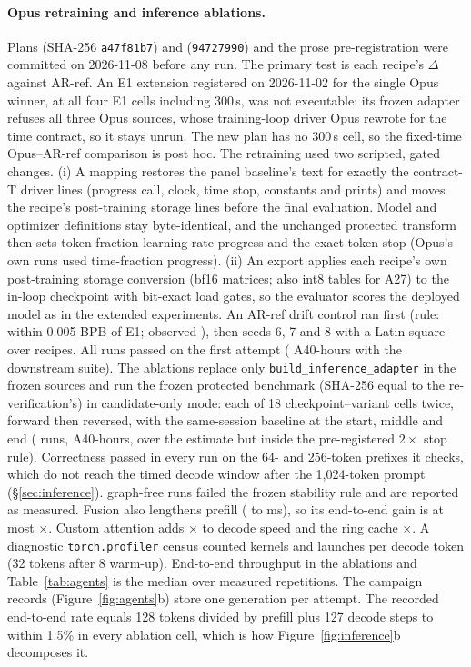 \documentclass{article}
\begin{document}
\paragraph{Opus retraining and inference ablations.} Plans  (SHA-256 \texttt{a47f81b7}) and  (\texttt{94727990}) and the prose pre-registration  were committed on 2026-11-08 before any run. The primary test is each recipe's $\Delta$ against AR-ref. An E1 extension registered on 2026-11-02 for the single Opus winner, at all four E1 cells including 300\,s, was not executable: its frozen adapter refuses all three Opus sources, whose training-loop driver Opus rewrote for the time contract, so it stays unrun. The new plan has no 300\,s cell, so the fixed-time Opus--AR-ref comparison is post hoc. The retraining used two scripted, gated changes. (i) A mapping restores the panel baseline's text for exactly the contract-T driver lines (progress call, clock, time stop, constants and prints) and moves the recipe's post-training storage lines before the final evaluation. Model and optimizer definitions stay byte-identical, and the unchanged protected transform then sets token-fraction learning-rate progress and the exact-token stop (Opus's own runs used time-fraction progress). (ii) An export applies each recipe's own post-training storage conversion (bf16 matrices; also int8 tables for A27) to the in-loop checkpoint with bit-exact load gates, so the evaluator scores the deployed model as in the extended experiments. An AR-ref drift control ran first (rule: within 0.005 BPB of E1; observed \CRMTDriftAbs), then seeds 6, 7 and 8 with a Latin square over recipes. All \CRMTRuns{} runs passed on the first attempt (\CRMTHours{} A40-hours with the downstream suite). The ablations replace only \texttt{build\_inference\_adapter} in the frozen sources and run the frozen protected benchmark (SHA-256 equal to the re-verification's) in candidate-only mode: each of 18 checkpoint--variant cells twice, forward then reversed, with the same-session baseline at the start, middle and end (\CRIARuns{} runs, \CRIAHours{} A40-hours, over the estimate but inside the pre-registered $2\times$ stop rule). Correctness passed in every run on the 64- and 256-token prefixes it checks, which do not reach the timed decode window after the 1{,}024-token prompt (\S\ref{sec:inference}). \CRIAUnstable{} graph-free runs failed the frozen stability rule and are reported as measured. Fusion also lengthens prefill (\CRThreePreNoFusion{} to \CRThreePreOpus{} ms), so its end-to-end gain is at most \CRIAFusionEtoEHi$\times$. Custom attention adds \CRIAAttnLo$\times$ to decode speed and the ring cache \CRIARingLo$\times$. A diagnostic \texttt{torch.profiler} census counted kernels and launches per decode token (32 tokens after 8 warm-up). End-to-end throughput in the ablations and Table~\ref{tab:agents} is the median over measured repetitions. The campaign records (Figure~\ref{fig:agents}b) store one generation per attempt. The recorded end-to-end rate equals 128 tokens divided by prefill plus 127 decode steps to within 1.5\% in every ablation cell, which is how Figure~\ref{fig:inference}b decomposes it.
\end{document}
